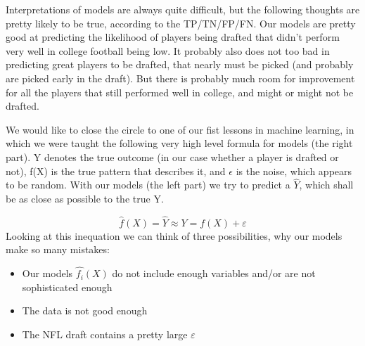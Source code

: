 \documentclass[]{article}
\providecommand{\tightlist}{%
  \setlength{\itemsep}{0pt}\setlength{\parskip}{0pt}}
\begin{document}
Interpretations of models are always quite difficult, but the following
thoughts are pretty likely to be true, according to the TP/TN/FP/FN. Our
models are pretty good at predicting the likelihood of players being
drafted that didn't perform very well in college football being low. It
probably also does not too bad in predicting great players to be
drafted, that nearly must be picked (and probably are picked early in
the draft). But there is probably much room for improvement for all the
players that still performed well in college, and might or might not be
drafted.

We would like to close the circle to one of our fist lessons in machine
learning, in which we were taught the following very high level formula
for models (the right part). Y denotes the true outcome (in our case
whether a player is drafted or not), f(X) is the true pattern that
describes it, and \(\epsilon\) is the noise, which appears to be random.
With our models (the left part) we try to predict a \(\hat{Y}\), which
shall be as close as possible to the true Y.

\[\hat{f}(X) = \hat{Y} \approx Y = f(X) + \varepsilon\] Looking at this
inequation we can think of three possibilities, why our models make so
many mistakes:

\begin{itemize}
\tightlist
\item
  Our models \(\hat{f_i}(X)\) do not include enough variables and/or are
  not sophisticated enough
\item
  The data is not good enough
\item
  The NFL draft contains a pretty large \(\varepsilon\)
\end{itemize}
\end{document}
